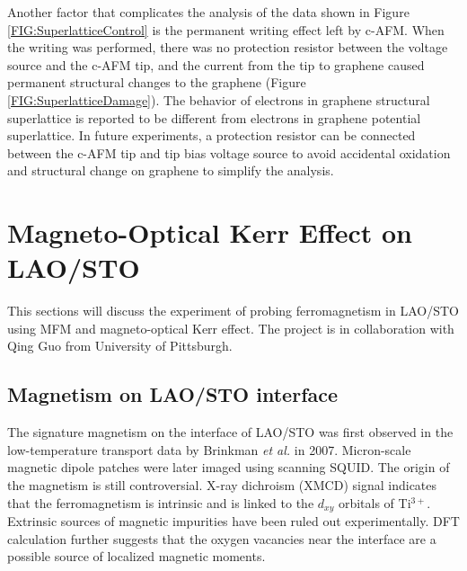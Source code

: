\documentclass[pdflatex, sectionletters, 12pt, final, phd]{pittetd}    %
\begin{document}
Another factor that complicates the analysis of the data shown in Figure \ref{FIG:SuperlatticeControl} is the permanent writing effect left by c-AFM. When the writing was performed, there was no protection resistor between the voltage source and the c-AFM tip, and the current from the tip to graphene caused permanent structural changes to the graphene (Figure \ref{FIG:SuperlatticeDamage}). The behavior of electrons in graphene structural superlattice is reported to be different from electrons in graphene potential superlattice\cite{jessen2019lithographic}. In future experiments, a protection resistor can be connected between the c-AFM tip and tip bias voltage source to avoid accidental oxidation and structural change on graphene to simplify the analysis.

\chapter{Magneto-Optical Kerr Effect on LAO/STO}
\label{SEC:Kerr}

This sections will discuss the experiment of probing ferromagnetism in LAO/STO using MFM and magneto-optical Kerr effect. The project is in collaboration with Qing Guo from University of Pittsburgh.

\section{Magnetism on LAO/STO interface}

The signature magnetism on the interface of LAO/STO was first observed in the low-temperature transport data by Brinkman \textit{et al.} in 2007\cite{brinkman2007magnetic}. Micron-scale magnetic dipole patches were later imaged using scanning SQUID\cite{bert2011direct, kalisky2012scanning, kalisky2012critical}. The origin of the magnetism is still controversial. X-ray dichroism (XMCD) signal indicates that the ferromagnetism is intrinsic and is linked to the $d_{xy}$ orbitals of Ti$^{3+}$\cite{lee2013titanium}. Extrinsic sources of magnetic impurities have been ruled out experimentally\cite{brinkman2007magnetic, lee2013titanium, ariando2011electronic}. DFT calculation further suggests that the oxygen vacancies near the interface are a possible source of localized magnetic moments\cite{pentcheva2006charge}. 
\end{document}
